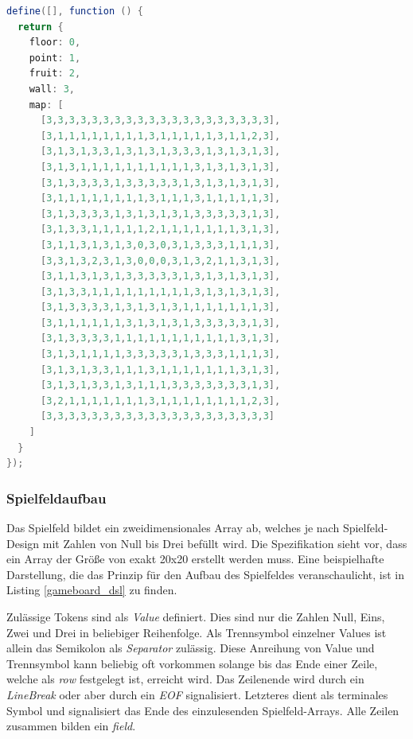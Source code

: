 \documentclass[conference]{IEEEtran}
\begin{document}
\begin{lstlisting}[language=Java, captionpos=b, caption=Generierte Level-Klasse in JavaScript, label=leveljs]
define([], function () {
  return {
    floor: 0,
    point: 1,
    fruit: 2,
    wall: 3,
    map: [
      [3,3,3,3,3,3,3,3,3,3,3,3,3,3,3,3,3,3,3,3],
      [3,1,1,1,1,1,1,1,1,3,1,1,1,1,1,3,1,1,2,3],
      [3,1,3,1,3,3,1,3,1,3,1,3,3,3,1,3,1,3,1,3],
      [3,1,3,1,1,1,1,1,1,1,1,1,1,3,1,3,1,3,1,3],
      [3,1,3,3,3,3,1,3,3,3,3,3,1,3,1,3,1,3,1,3],
      [3,1,1,1,1,1,1,1,1,3,1,1,1,3,1,1,1,1,1,3],
      [3,1,3,3,3,3,1,3,1,3,1,3,1,3,3,3,3,3,1,3],
      [3,1,3,3,1,1,1,1,1,2,1,1,1,1,1,1,1,3,1,3],
      [3,1,1,3,1,3,1,3,0,3,0,3,1,3,3,3,1,1,1,3],
      [3,3,1,3,2,3,1,3,0,0,0,3,1,3,2,1,1,3,1,3],
      [3,1,1,3,1,3,1,3,3,3,3,3,1,3,1,3,1,3,1,3],
      [3,1,3,3,1,1,1,1,1,1,1,1,1,3,1,3,1,3,1,3],
      [3,1,3,3,3,3,1,3,1,3,1,3,1,1,1,1,1,1,1,3],
      [3,1,1,1,1,1,1,3,1,3,1,3,1,3,3,3,3,3,1,3],
      [3,1,3,3,3,3,1,1,1,1,1,1,1,1,1,1,1,3,1,3],
      [3,1,3,1,1,1,1,3,3,3,3,3,1,3,3,3,1,1,1,3],
      [3,1,3,1,3,3,1,1,1,3,1,1,1,1,1,1,1,3,1,3],
      [3,1,3,1,3,3,1,3,1,1,1,3,3,3,3,3,3,3,1,3],
      [3,2,1,1,1,1,1,1,1,3,1,1,1,1,1,1,1,1,2,3],
      [3,3,3,3,3,3,3,3,3,3,3,3,3,3,3,3,3,3,3,3]
    ]
  }
});
\end{lstlisting}

\subsubsection{Spielfeldaufbau}
\label{spielfeldaufb}
Das Spielfeld bildet ein zweidimensionales Array ab, welches je nach Spielfeld-Design mit Zahlen von Null bis Drei befüllt wird. Die Spezifikation sieht vor, dass ein Array der Größe von exakt 20x20 erstellt werden muss. Eine beispielhafte Darstellung, die das Prinzip für den Aufbau des Spielfeldes veranschaulicht, ist in Listing \ref{gameboard_dsl} zu finden.

Zulässige Tokens sind als \emph{Value} definiert. Dies sind nur die Zahlen Null, Eins, Zwei und Drei in beliebiger Reihenfolge. Als Trennsymbol einzelner Values ist allein das Semikolon als \emph{Separator} zulässig. Diese Anreihung von Value und Trennsymbol kann beliebig oft vorkommen solange bis das Ende einer Zeile, welche als \emph{row} festgelegt ist, erreicht wird. Das Zeilenende wird durch ein \emph{LineBreak} oder aber durch ein \emph{EOF} signalisiert. Letzteres dient als terminales Symbol und signalisiert das Ende des einzulesenden Spielfeld-Arrays. Alle Zeilen zusammen bilden ein \emph{field}.
\end{document}
